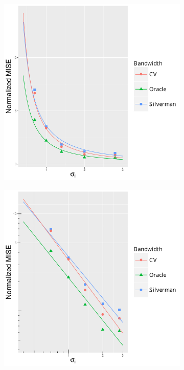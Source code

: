 \begin{figure}[htbp]
\begin{subfigure}[t]{0.24\textwidth}
        \caption{}
        \label{fig:ise:unif_Spreads_1h:rmise}
    \end{subfigure}
    \begin{subfigure}[t]{0.24\textwidth}
        \includegraphics[width=\textwidth]{results/by_cases_spread/NMISE-vs-risk-spread}
        \caption{}
        \label{fig:ise:unif_Spreads_1h:nmise}
    \end{subfigure}
    \begin{subfigure}[t]{0.24\textwidth}
        \includegraphics[width=\textwidth]{results/by_cases_spread/NMISE-vs-risk-spread-log-log}

\end{subfigure}
\end{figure}
